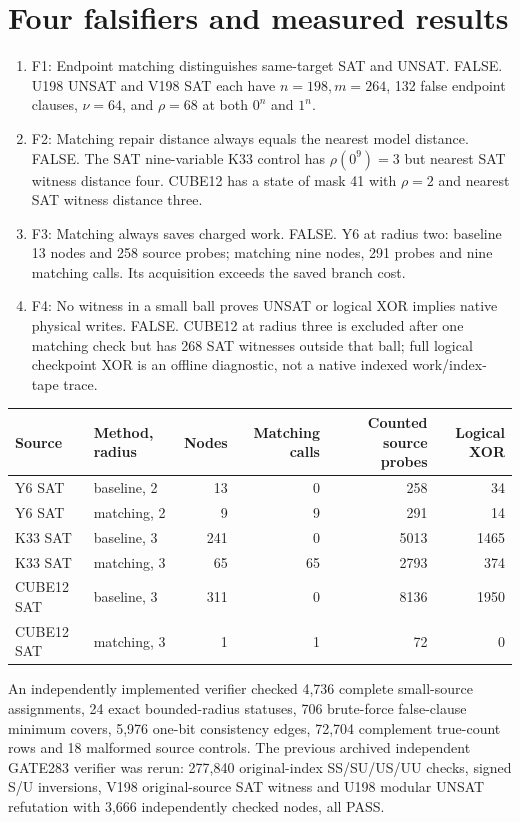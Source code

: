 \documentclass[11pt]{article}
\begin{document}
\section{Four falsifiers and measured results}
\begin{enumerate}
\item[] F1: Endpoint matching distinguishes same-target SAT and UNSAT. FALSE. U198 UNSAT and V198 SAT each have $n=198,m=264$, 132 false endpoint clauses, $\nu=64$, and $\rho=68$ at both $0^n$ and $1^n$.
\item[] F2: Matching repair distance always equals the nearest model distance. FALSE. The SAT nine-variable K33 control has $\rho(0^9)=3$ but nearest SAT witness distance four. CUBE12 has a state of mask 41 with $\rho=2$ and nearest SAT witness distance three.
\item[] F3: Matching always saves charged work. FALSE. Y6 at radius two: baseline 13 nodes and 258 source probes; matching nine nodes, 291 probes and nine matching calls. Its acquisition exceeds the saved branch cost.
\item[] F4: No witness in a small ball proves UNSAT or logical XOR implies native physical writes. FALSE. CUBE12 at radius three is excluded after one matching check but has 268 SAT witnesses outside that ball; full logical checkpoint XOR is an offline diagnostic, not a native indexed work/index-tape trace.
\end{enumerate}
\begin{center}\begin{tabular}{llrrrr}\toprule
Source & Method, radius & Nodes & Matching calls & Counted source probes & Logical XOR\\\midrule
Y6 SAT & baseline, 2 &13&0&258&34\\
Y6 SAT & matching, 2 &9&9&291&14\\
K33 SAT & baseline, 3 &241&0&5013&1465\\
K33 SAT & matching, 3 &65&65&2793&374\\
CUBE12 SAT & baseline, 3 &311&0&8136&1950\\
CUBE12 SAT & matching, 3 &1&1&72&0\\\bottomrule
\end{tabular}\end{center}
An independently implemented verifier checked 4,736 complete small-source assignments, 24 exact bounded-radius statuses, 706 brute-force false-clause minimum covers, 5,976 one-bit consistency edges, 72,704 complement true-count rows and 18 malformed source controls. The previous archived independent GATE283 verifier was rerun: 277,840 original-index SS/SU/US/UU checks, signed S/U inversions, V198 original-source SAT witness and U198 modular UNSAT refutation with 3,666 independently checked nodes, all PASS.
\end{document}
